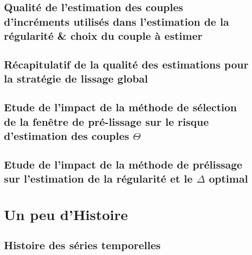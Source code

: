 \minitoc%

\section{Qualité de l'estimation des couples d'incréments utilisés dans l'estimation de la régularité \& choix du couple à estimer}
\label{annexe:choix_risque_couple}


% 


\section{Récapitulatif de la qualité des estimations pour la stratégie de \og lissage global \fg}


\section{Etude de l'impact de la méthode de sélection de la fenêtre de pré-lissage sur le risque d'estimation des couples $\Theta$}





\section{Etude de l'impact de la méthode de prélissage sur l'estimation de la régularité et le $\Delta$ optimal}
\label{annexe:prelissage_impact}



\chapter{Un peu d'Histoire}
\label{annexe:histoire}
\section{ Histoire des séries temporelles }

\pagebreak

